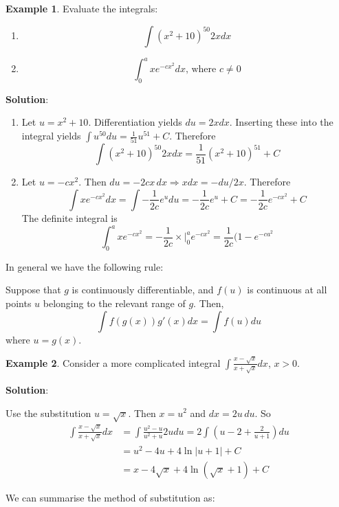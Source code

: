 \documentclass[10pt,a4paper]{book}
\theoremstyle{definition}\newtheorem{definition}{Definition}
\theoremstyle{definition}\newtheorem{fact}{Fact}
\theoremstyle{definition}\newtheorem{ex}{Ex.}
\theoremstyle{definition}\newtheorem{project}{Project}
\theoremstyle{definition}\newtheorem{problem}{Problem}
\theoremstyle{definition}\newtheorem{example}{Example}
\numberwithin{theorem}{chapter}
\numberwithin{corollary}{chapter}
\numberwithin{assumption}{chapter}
\numberwithin{definition}{chapter}
\numberwithin{prop}{chapter}
\numberwithin{notation}{chapter}
\numberwithin{problem}{chapter}
\numberwithin{example}{chapter}
\numberwithin{fact}{chapter}
\numberwithin{ex}{chapter}
\begin{document}
	\begin{example}
		Evaluate the integrals:
		\begin{enumerate}[label=(\alph*)]
			\item $$\int(x^2+10)^{50} 2x dx$$
			\item $$\int_0^a xe^{-cx^2} dx \text{, where } c\neq 0$$
		\end{enumerate}
		\textbf{Solution}:
		\begin{enumerate}[label=(\alph*)]
			\item Let $u=x^2 +10$. Differentiation yields $du = 2x dx$. Inserting these into the integral yields $\int u^{50} du = \frac{1}{51}u^{51} + C$. Therefore
			$$\int (x^2+10)^{50} 2x dx = \frac{1}{51} (x^2+10)^{51} + C $$
			\item Let $u = -cx^2$. Then $du = -2cx\,dx \Rightarrow xdx=-du/2x$. Therefore
			$$\int xe^{-cx^2} dx = \int -\frac{1}{2c}e^u du = -\frac{1}{2c}e^u + C = - \frac{1}{2c}e^{-cx^2} + C$$
			The definite integral is
			$$\int_0^a xe^{-cx^2} = -\frac{1}{2c} \times \bigg |_0^a e^{-cx^2}  = \frac{1}{2c}(1-e^{-ca^2} $$
		\end{enumerate}
	\end{example}
	
	In general we have the following rule:
	
	Suppose that $g$ is continuously differentiable, and $f(u)$ is continuous at all points $u$ belonging to the relevant range of $g$. Then,
	$$ \int f(g(x))g'(x) dx = \int f(u) du $$
	where $u=g(x)$.
	
	\begin{example}
		Consider a more complicated integral $\int \frac{x-\sqrt{x}}{x+\sqrt{x}}dx$, $x>0$.
		
		\textbf{Solution}:
		
		Use the substitution $u=\sqrt{x}$. Then $x = u^2$ and $dx = 2u\,du$. So
		\begin{align*}
			\int \frac{x-\sqrt{x}}{x+\sqrt{x}}dx & = \int \frac{u^2-u}{u^2+u} 2u du = 2\int \left( u-2+\frac{2}{u+1} \right) du \\
			& = u^2 - 4u + 4\ln |u+1| + C                                                  \\
			& = x - 4\sqrt{x} + 4\ln(\sqrt{x}+1) + C                                       
		\end{align*}
	\end{example}
	
	We can summarise the method of substitution as:
	
\end{document}

